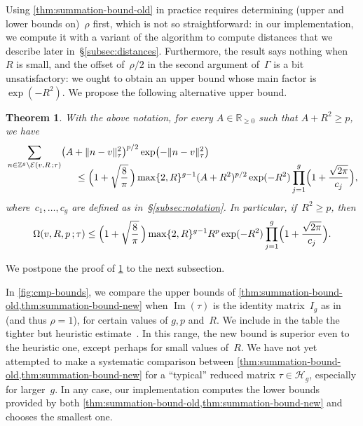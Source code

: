 \documentclass[12pt,oneside]{amsart}
\numberwithin{equation}{section}
\newtheorem{thm}[equation]{Theorem}
\theoremstyle{definition}
\newcommand{\Z}{\mathbb{Z}}
\newcommand{\R}{\mathbb{R}}
\newcommand{\Half}{\mathcal{H}}
\newcommand{\eld}[3]{\ensuremath{\mathcal{E}(#1, #2\,; #3)}}
\newcommand{\tailsum}[4]{\ensuremath{\Omega(#1,#2,#3\,;#4)}}
\DeclareMathOperator{\im}{Im}
\DeclarePairedDelimiter{\paren}{(}{)}
\DeclarePairedDelimiter{\norm}{\|}{\|}
\begin{document}
Using \cref{thm:summation-bound-old} in practice requires determining (upper
and lower bounds on)~$\rho$ first, which is not so straightforward: in our
implementation, we compute it with a variant of the algorithm to compute
distances that we describe later in~§\ref{subsec:distances}. Furthermore, the
result says nothing when~$R$ is small, and the offset of~$\rho/2$ in the second
argument of~$\Gamma$ is a bit unsatisfactory: we ought to obtain an upper bound
whose main factor is~$\exp(-R^2)$. We propose the following alternative upper
bound.

\begin{thm}
  \label{thm:summation-bound-new}
  With the above notation, for every $A\in \R_{\geq 0}$ such that $A+R^2\geq p$, we have
  \begin{align*}
    &\sum_{n\in  \Z^g\setminus \eld{v}{R}{\tau}} \paren[\big]{A + \norm{n - v}_\tau^2}^{p/2}
    \exp\paren[\big]{-\norm{n - v}_\tau^2}\\[-1em]
    &\hspace{2.5cm}
      \leq \paren[\Big]{1 + \sqrt{\frac 8\pi}\,} \max\{2,R\}^{g-1} (A + R^2)^{p/2} \exp(- R^2) \prod_{j=1}^{g}
      \paren[\Big]{1 + \frac{\sqrt{2\pi}}{c_j}},
  \end{align*}
  where~$c_1,\ldots,c_g$ are defined as in~§\ref{subsec:notation}. In
  particular, if~$R^2\geq p$, then
  \begin{displaymath}
    \tailsum{v}{R}{p}{\tau}
    \leq \paren[\Big]{1 + \sqrt{\frac 8\pi}\,} \max\{2,R\}^{g-1} R^p \exp(- R^2) \prod_{j=1}^{g} \paren[\Big]{1 + \frac{\sqrt{2\pi}}{c_j}}.
  \end{displaymath}
\end{thm}

We postpone the proof of \cref{thm:summation-bound-new} to the next subsection.

In \cref{fig:cmp-bounds}, we compare the upper bounds of
\cref{thm:summation-bound-old,thm:summation-bound-new} when $\im(\tau)$ is the
identity matrix~$I_g$ as in \cite[Table 1]{deconinckComputingRiemannTheta2004}
(and thus $\rho = 1$), for certain values of $g,p$ and~$R$. We include in the
table the tighter but heuristic
estimate~\cite[eq.\,(15)]{deconinckComputingRiemannTheta2004}. In this range,
the new bound is superior even to the heuristic one, except perhaps for small
values of~$R$. We have not yet attempted to make a systematic comparison
between \cref{thm:summation-bound-old,thm:summation-bound-new} for a
``typical'' reduced matrix $\tau\in\Half_g$, especially for larger~$g$. In any
case, our implementation computes the lower bounds provided by both
\cref{thm:summation-bound-old,thm:summation-bound-new} and chooses the smallest
one.
\end{document}
